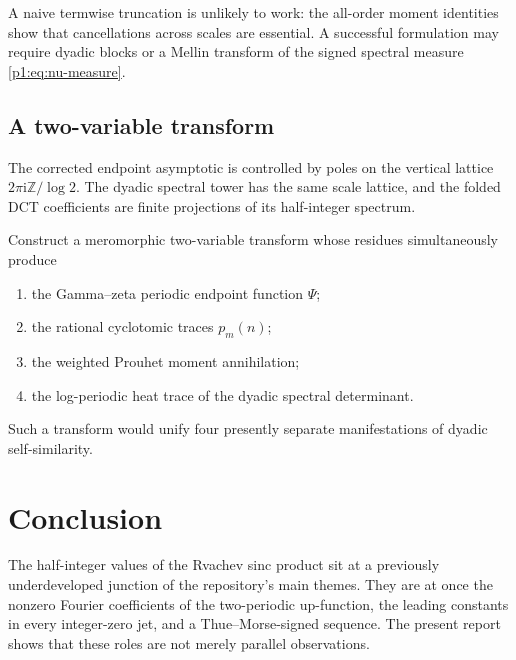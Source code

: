 \documentclass[11pt,oneside]{article}
\theoremstyle{definition}
\theoremstyle{remark}
\newcommand{\Z}{\mathbb Z}
\newcommand{\ii}{\mathrm i}
\begin{document}
A naive termwise truncation is unlikely to work: the all-order moment identities
show that cancellations across scales are essential.  A successful formulation
may require dyadic blocks or a Mellin transform of the signed spectral measure
\eqref{p1:eq:nu-measure}.

\subsection{A two-variable transform}

The corrected endpoint asymptotic is controlled by poles on the vertical
lattice $2\pi\ii\Z/\log2$.  The dyadic spectral tower has the same scale lattice,
and the folded DCT coefficients are finite projections of its half-integer
spectrum.

\begin{problem}\label{p1:prob:two-variable-transform}
Construct a meromorphic two-variable transform whose residues simultaneously
produce
\begin{enumerate}
 \item the Gamma--zeta periodic endpoint function $\Psi$;
 \item the rational cyclotomic traces $p_m(n)$;
 \item the weighted Prouhet moment annihilation;
 \item the log-periodic heat trace of the dyadic spectral determinant.
\end{enumerate}
Such a transform would unify four presently separate manifestations of dyadic
self-similarity.
\end{problem}

\section{Conclusion}\label{p1:sec:conclusion}

The half-integer values of the Rvachev sinc product sit at a previously
underdeveloped junction of the repository's main themes.  They are at once the
nonzero Fourier coefficients of the two-periodic up-function, the leading
constants in every integer-zero jet, and a Thue--Morse-signed sequence.  The
present report shows that these roles are not merely parallel observations.
\end{document}
